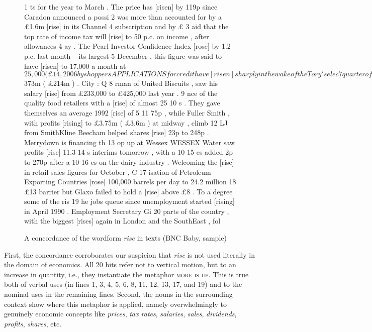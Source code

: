 \begin{figure}
\caption{A concordance of the wordform \textit{rise} in  texts (BNC Baby, sample)}
\label{fig:riseconc}
\hrulefill
\begin{fitverb}
 1 ts for the year to March . The price has [risen] by 119p since Caradon announced a possi
 2   was more than accounted for by a £1.6m [rise] in its Channel 4 subscription and by £
 3 aid that the top rate of income tax will [rise] to 50 p.c. on income , after allowances
 4 ay . The Pearl Investor Confidence Index [rose] by 1.2 p.c. last month -- its largest
 5  December , this figure was said to have [risen] to 17,000 a month at $25,000 ( £14,200
 6 by shoppers APPLICATIONS for credit have [risen] sharply in the wake of the Tory 's elec
 7  quarter of the year , despite a 15 p.c. [rise] in sales to $373m ( £214m ) . City : Q
 8 rman of United Biscuits , saw his salary [rise] from £233,000 to £425,000 last year .
 9 nce of the quality food retailers with a [rise] of almost 25%
10 s . They gave themselves an average 1992 [rise] of 5%
11  75p , while Fuller Smith , with profits [rising] to £3.75m ( £3.6m ) at midway , climb
12 LJ from SmithKline Beecham helped shares [rise] 23p to 248p . Merrydown is financing th
13 op up at Wessex WESSEX Water saw profits [rise] 11.3%
14 s interims tomorrow , with a 10%
15 es added 2p to 270p after a 10%
16 es on the dairy industry . Welcoming the [rise] in retail sales figures for October , C
17 isation of Petroleum Exporting Countries [rose] 100,000 barrels per day to 24.2 million
18   £13 barrier but Glaxo failed to hold a [rise] above £8 . To a degree some of the ris
19 he jobs queue since unemployment started [rising] in April 1990 . Employment Secretary Gi
20  parts of the country , with the biggest [rises] again in London and the SouthEast , fol
\end{fitverb}
\hrulefill
\end{figure}

First, the concordance  corroborates our suspicion that \textit{rise} is not used literally  in the domain of economics. All 20 hits refer not to vertical motion, but to an increase in quantity, i.e., they instantiate the metaphor  \textsc{more is up}. This is true both of verbal  uses (in lines 1, 3, 4, 5, 6, 8, 11, 12, 13, 17, and 19) and to the nominal  uses in the remaining lines. Second, the nouns in the surrounding context show where this metaphor is applied, namely overwhelmingly to genuinely economic concepts like \textit{prices}, \textit{tax rates}, \textit{salaries}, \textit{sales}, \textit{dividends}, \textit{profits}, \textit{shares}, etc.

